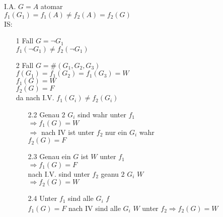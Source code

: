 \documentclass[a4paper]{scrartcl}
\begin{document}
I.A. $G = A$ atomar\\
$f_1(G_1) = f_1(A) \neq f_2(A) = f_2(G)$\\
IS:
\begin{enumerate}
\item[1 Fall] $G = \neg G_1$\\
$f_1( \neg G_1) \neq f_2( \neg G_1)$

\item[2 Fall] $G = \# (G_1, G_2, G_3)$\\
$f(G_1) = f_1(G_2) = f_1 (G_3) = W$\\
$f_1 (G) = W$\\
$f_2(G) = F$\\
da nach I.V. $f_1(G_i) \neq f_2 (G_i)$

\begin{enumerate}
\item[2.2] Genau $2$ $G_i$ sind wahr unter $f_1$\\
$\Rightarrow f_1(G) = W$\\
$\Rightarrow$ nach IV ist unter $f_2$ nur ein $G_i$ wahr\\
$f_2(G) = F$

\item[2.3] Genau ein $G$ ist $W$ unter $f_1$\\
$\Rightarrow f_1 (G) = F$\\
nach I.V. sind unter $f_2$ geanu $2$ $G_i$ $W$\\
$\Rightarrow f_2 (G) = W$\\

\item[2.4] Unter $f_1$ sind alle $G_i$ $f$\\
$f_1(G) = F$ nach IV sind alle $G_i$ $W$ unter $f_2 \Rightarrow f_2 ( G) = W$
\end{enumerate}
\end{enumerate}
\end{document}
